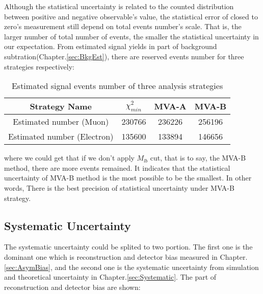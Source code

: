 		Although the statistical uncertainty is related to the counted distribution between positive and negative observable's value, the statistical error of closed to zero's measurement still depend on total events number's scale. That is, the larger number of total number of events, the smaller the statistical uncertainty in our expectation. From estimated signal yields in part of background subtration(Chapter.\ref{sec:BkgEst}), there are reserved events number for three strategies respectively:

		\begin{center}
		\setlength{\tabcolsep}{12pt}
		\begin{longtable}{ | c | c c c | }
		\caption{Estimated signal events number of three analysis strategies} \\
		\hline
		Strategy Name & $\chi^2_{min}$ & MVA-A & MVA-B \\ 
		\hline
		Estimated number (Muon) & 230766 & 236226 & 256196 \\ 
		Estimated number (Electron) & 135600 & 133894 & 146656 \\
		\hline
		\end{longtable}
		\end{center}
		\FloatBarrier

		where we could get that if we don't apply $M_{lb}$ cut, that is to say, the MVA-B method, there are more events remained. It indicates that the statistical uncertainty of MVA-B method is the most possible to be the smallest. In other words, There is the best precision of statistical uncertainty under MVA-B strategy.

	\subsection{Systematic Uncertainty}
	\label{ssec:Result_SystUnc}
		The systematic uncertainty could be splited to two portion. The first one is the dominant one which is reconstruction and detector bias measured in Chapter.\ref{sec:AsymBias}, and the second one is the systematic uncertainty from simulation and theoretical uncertainty in Chapter.\ref{sec:Systematic}. The part of reconstruction and detector bias are shown:

